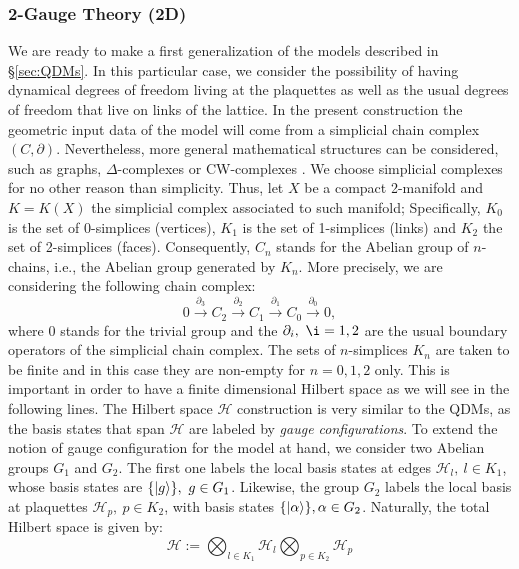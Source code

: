 \documentclass[titlepage,11pt]{article}
\theoremstyle{plain}%
\theoremstyle{definition}
\theoremstyle{remark}
\begin{document}
\subsubsection{2-Gauge Theory (2D)}\label{sec:2gauge}
We are ready to make a first generalization of the models described in \S \ref{sec:QDMs}. In this particular case, we consider the possibility of having dynamical degrees of freedom living at the plaquettes as well as the usual degrees of freedom that live on links of the lattice. In the present construction the geometric input data of the model will come from a simplicial chain complex $(C,\partial)$. Nevertheless, more general mathematical structures can be considered, such as graphs, $\Delta$-complexes  or CW-complexes \cite{Hatcher}. We choose simplicial complexes for no other reason than simplicity. Thus, let $X$ be a compact 2-manifold and $K=K(X)$ the simplicial complex associated to such manifold; Specifically, $K_0$ is the set of 0-simplices (vertices), $K_1$ is the set of 1-simplices (links) and $K_2$ the set of 2-simplices (faces). Consequently, $C_n$ stands for the Abelian group of $n$-chains, i.e., the Abelian group generated by $K_n$.
More precisely, we are considering the following chain complex:
 \begin{equation}\label{eq:GeomChainCompAbQDM}
0 \xrightarrow{\partial_{3}} C_{2} \xrightarrow{\partial_2}  C_{1}  \xrightarrow{\partial_1} C_0 \xrightarrow{\partial_0} 0,
 \end{equation}
where $0$ stands for the trivial group and the $\partial_i, \ \i=1,2$ are the usual boundary operators of the simplicial chain complex. 
The sets of $n$-simplices $K_n$ are taken to be finite and in this case they are non-empty for $n=0,1,2$ only. This is important in order to have a finite dimensional Hilbert space as we will see in the following lines. The Hilbert space $\mathcal{H}$ construction is very similar to the QDMs, as the basis states that span   
$\mathcal{H}$ are labeled by \emph{gauge configurations}. To extend the notion of gauge configuration for the model at hand, we consider two Abelian groups $G_1$ and $G_2$. The first one labels the local basis states at edges $\mathcal{H}_l, \
l \in K_1$, whose basis states are $\{\ket{g}\}, \ g \in G_1$. Likewise, the group $G_2$ labels the local basis at plaquettes $\mathcal{H}_p, \ p \in K_2$, with basis states $\{\ket{\alpha}\}, \alpha \in G_2$. Naturally, the total Hilbert space is given by:
\begin{equation}\label{eq:Hilb2G}
\mathcal{H}:=\bigotimes_{l\in K_1} \mathcal{H}_l \bigotimes_{p \in K_2} \mathcal{H}_p
\end{equation}
\end{document}
